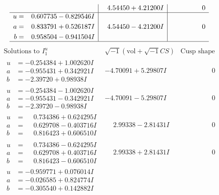 \documentclass[1p]{elsarticle_modified}
\theoremstyle{definition}
\newcommand{\I}{\sqrt{-1}}
\begin{document}
$$\begin{array}{c|c|c}
 & \phantom{-}4.54450 + 4.21200 I & \phantom{-0.000000 } 0 \\ \hline\begin{aligned}
u &= \phantom{-}0.607735 - 0.829546 I \\
a &= \phantom{-}0.833791 + 0.526187 I \\
b &= \phantom{-}0.958504 - 0.941504 I\end{aligned}
 & \phantom{-}4.54450 - 4.21200 I & \phantom{-0.000000 } 0\\
 \hline 
 \end{array}$$\newpage$$\begin{array}{c|c|c}  
\text{Solutions to }I^u_{1}& \I (\text{vol} + \sqrt{-1}CS) & \text{Cusp shape}\\
 \hline 
\begin{aligned}
u &= -0.254384 + 1.002620 I \\
a &= -0.955431 + 0.342921 I \\
b &= -2.39720 + 0.98938 I\end{aligned}
 & -4.70091 + 5.29807 I & \phantom{-0.000000 } 0 \\ \hline\begin{aligned}
u &= -0.254384 - 1.002620 I \\
a &= -0.955431 - 0.342921 I \\
b &= -2.39720 - 0.98938 I\end{aligned}
 & -4.70091 - 5.29807 I & \phantom{-0.000000 } 0 \\ \hline\begin{aligned}
u &= \phantom{-}0.734386 + 0.624295 I \\
a &= \phantom{-}0.629708 - 0.403716 I \\
b &= \phantom{-}0.816423 + 0.606510 I\end{aligned}
 & \phantom{-}2.99338 - 2.81431 I & \phantom{-0.000000 } 0 \\ \hline\begin{aligned}
u &= \phantom{-}0.734386 - 0.624295 I \\
a &= \phantom{-}0.629708 + 0.403716 I \\
b &= \phantom{-}0.816423 - 0.606510 I\end{aligned}
 & \phantom{-}2.99338 + 2.81431 I & \phantom{-0.000000 } 0 \\ \hline\begin{aligned}
u &= -0.959771 + 0.076014 I \\
a &= -0.026585 + 0.824774 I \\
b &= -0.305540 + 0.142882 I\end{aligned}

\end{array}$$
\end{document}
